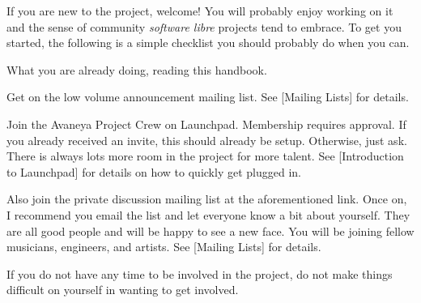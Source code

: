 

If you are new to the project, welcome! You will probably enjoy working on it and the sense of community {\it software libre} projects tend to embrace. To get you started, the following is a simple checklist you should probably do when you can.

\startitemize[3]
\item
What you are already doing, reading this handbook.

\item
Get on the low volume announcement mailing list. See [Mailing Lists] for details.

\item
Join the Avaneya Project Crew on Launchpad. Membership requires approval. If you already received an invite, this should already be setup. Otherwise, just ask. There is always lots more room in the project for more talent. See [Introduction to Launchpad] for details on how to quickly get plugged in.

\item
Also join the private discussion mailing list at the aforementioned link. Once on, I recommend you email the list and let everyone know a bit about yourself. They are all good people and will be happy to see a new face. You will be joining fellow musicians, engineers, and artists. See [Mailing Lists] for details.

\item
If you do not have any time to be involved in the project, do not make things difficult on yourself in wanting to get involved.
\stopitemize

